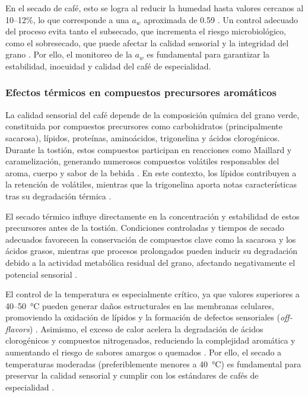 En el secado de café, esto se logra al reducir la humedad hasta valores cercanos al 10--12\%, lo que corresponde a una $a_w$ aproximada de 0.59 \parencite{guevara-sanchez_effect_2019, huaman-murillo_physical_2024}. Un control adecuado del proceso evita tanto el subsecado, que incrementa el riesgo microbiológico, como el sobresecado, que puede afectar la calidad sensorial y la integridad del grano \parencite{abdissa_harmonizing_2023, sandeep_effect_2021}. Por ello, el monitoreo de la $a_w$ es fundamental para garantizar la estabilidad, inocuidad y calidad del café de especialidad.

\subsubsection{Efectos térmicos en compuestos precursores aromáticos}

La calidad sensorial del café depende de la composición química del grano verde, constituida por compuestos precursores como carbohidratos (principalmente sacarosa), lípidos, proteínas, aminoácidos, trigonelina y ácidos clorogénicos. Durante la tostión, estos compuestos participan en reacciones como Maillard y caramelización, generando numerosos compuestos volátiles responsables del aroma, cuerpo y sabor de la bebida \parencite{eshetu_effect_2022, tieghi_effects_2024}. En este contexto, los lípidos contribuyen a la retención de volátiles, mientras que la trigonelina aporta notas características tras su degradación térmica \parencite{largoavila_changes_2023}.

El secado térmico influye directamente en la concentración y estabilidad de estos precursores antes de la tostión. Condiciones controladas y tiempos de secado adecuados favorecen la conservación de compuestos clave como la sacarosa y los ácidos grasos, mientras que procesos prolongados pueden inducir su degradación debido a la actividad metabólica residual del grano, afectando negativamente el potencial sensorial \parencite{largoavila_changes_2023, borem_quality_2018}.

El control de la temperatura es especialmente crítico, ya que valores superiores a 40--50~°C pueden generar daños estructurales en las membranas celulares, promoviendo la oxidación de lípidos y la formación de defectos sensoriales (\textit{off-flavors}) \parencite{borem_quality_2018, oliveira_quality_2018}. Asimismo, el exceso de calor acelera la degradación de ácidos clorogénicos y compuestos nitrogenados, reduciendo la complejidad aromática y aumentando el riesgo de sabores amargos o quemados \parencite{maryana_performance_2025}. Por ello, el secado a temperaturas moderadas (preferiblemente menores a 40~°C) es fundamental para preservar la calidad sensorial y cumplir con los estándares de cafés de especialidad \parencite{abreu_influence_2025, de_almeida_rios_origin_2021}.

